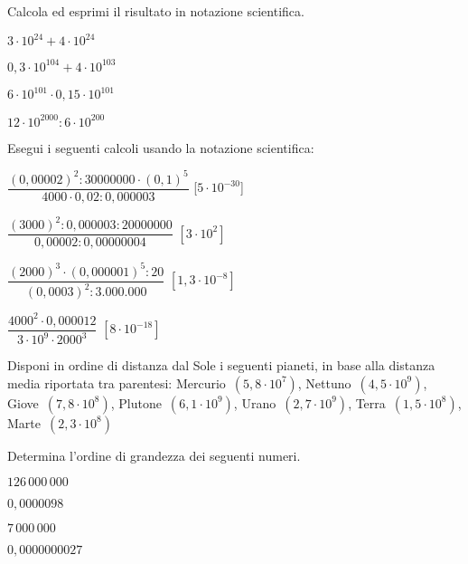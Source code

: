 
\begin{esercizio}
 \label{ese:3.66}
Calcola ed esprimi il risultato in notazione scientifica.
\begin{multicols}{2}
\begin{enumeratea}
\item \(3\cdot10^{24} +4\cdot10^{24}\)
\item \(0,3\cdot10^{104} +4\cdot10^{103}\)
\item \(6\cdot10^{101}\cdot0,15\cdot10^{101}\)
\item \(12\cdot10^{2000}:6\cdot10^{200}\)
\end{enumeratea}
\end{multicols}
\end{esercizio}

\begin{esercizio}[\Ast]
 \label{ese:3.67}
Esegui i seguenti calcoli usando la notazione scientifica:

\begin{multicols}{2}
\begin{enumeratea}
\item \(\dfrac{(0,00002)^2:30000000\cdot(0,1)^5}{4000 \cdot0,02:0,000003}\)
\hfill [\(5\cdot10^{-30}\)]
\item \(\dfrac{(3000)^2:0,000003:20000000}{0,00002:0,00000004}\)
\hfill \(\left[3\cdot10^2 \right]\)
\item \(\dfrac{(2000)^3 \cdot (0,000001)^5:20}{(0,0003)^2:3.000.000}\)
\hfill \(\left[1,3\cdot10^{-8} \right]\)
\item \(\dfrac{4000^2\cdot 0,000012}{3\cdot 10^9\cdot 2000^3}\)
\hfill \(\left[8\cdot10^{-18} \right]\)
\end{enumeratea}
\end{multicols}
\end{esercizio}

\begin{esercizio}
 \label{ese:3.71}
Disponi in ordine di distanza dal Sole i seguenti pianeti, in base alla 
distanza media riportata
tra parentesi: Mercurio~\((5,8\cdot10^7)\), Nettuno~\((4,5\cdot10^9)\), 
Giove~\((7,8\cdot10^8)\),
Plutone~\((6,1\cdot10^9)\), Urano~\((2,7\cdot10^9)\), Terra~\((1,5\cdot10^8)\), 
Marte~\((2,3\cdot10^8)\)
\end{esercizio}


\begin{esercizio}
 \label{ese:3.72}
Determina l'ordine di grandezza dei seguenti numeri.
\begin{multicols}{4}
\begin{enumeratea}
\item \(126\,000\,000\)
\item \(0,0000098\)
\item \(7\,000\,000\)
\item \(0,0000000027\)
\end{enumeratea}
\end{multicols}
\end{esercizio}

